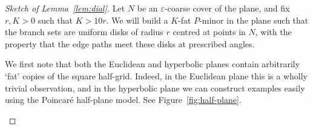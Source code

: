 \documentclass[10pt,a4paper]{amsart}
\theoremstyle{definition}
\begin{document}
\begin{proof}[Sketch of Lemma~\ref{lem:dial}]
	Let $N$ be an $\varepsilon$-coarse cover of the plane, and fix $r, K > 0$ such that $K > 10r$. We will build a $K$-fat $P$-minor in the plane such that the branch sets are uniform disks of radius $r$ centred at points in $N$, with the property that the edge paths meet these disks at prescribed angles. 
	
	We first note that both the Euclidean and hyperbolic planes contain arbitrarily `fat' copies of the square half-grid. Indeed, in the Euclidean plane this is a wholly trivial observation, and in the hyperbolic plane we can construct examples easily using the Poincar\'e half-plane model. See Figure~\ref{fig:half-plane}. 
	
	\begin{figure}[t]
		\centering
		


\begin{tikzpicture}[x=0.75pt,y=0.75pt,yscale=-1,xscale=1]



\end{tikzpicture}
\end{figure}
\end{proof}
\end{document}
